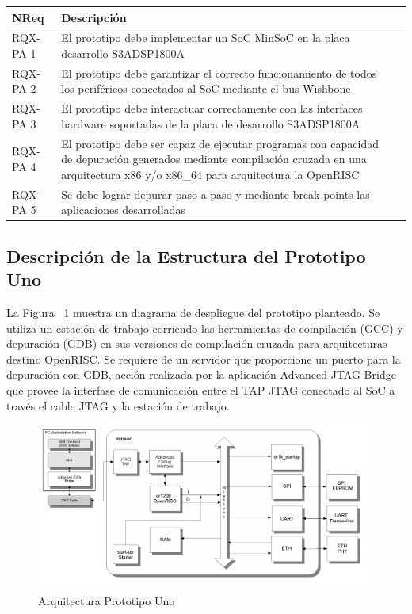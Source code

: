 		\begin{table}[h]
		\centering
		\begin{tabular}{ p{2.5cm} p{8cm} p{3cm} }
		\hline 
		\rowcolor[gray]{0.8} N\textordmasculine Req & Descripción\\
		\hline 
		RQX-PA 1 & El prototipo debe implementar un SoC MinSoC en la placa desarrollo S3ADSP1800A\\ 
		\hline 
		RQX-PA 2 & El prototipo debe garantizar el correcto funcionamiento de todos los periféricos conectados al SoC mediante el bus Wishbone\\ 
		\hline 
		RQX-PA 3 & El prototipo debe interactuar correctamente con las interfaces hardware soportadas de la placa de desarrollo S3ADSP1800A\\ 
		\hline
		RQX-PA 4 & El prototipo debe ser capaz de ejecutar programas con capacidad de depuración generados mediante compilación
		cruzada en una arquitectura x86 y/o x86\_64 para arquitectura la OpenRISC\\
		\hline
		RQX-PA 5 & Se debe lograr depurar paso a paso y mediante break points las aplicaciones desarrolladas\\
		\hline		
		\end{tabular}
		\end{table}
		
\newpage
		\subsection{Descripción de la Estructura del Prototipo Uno}
			

		La Figura ~\ref{fig:minsoc} muestra un diagrama de despliegue del prototipo planteado. Se utiliza un estación de trabajo corriendo las herramientas de compilación (GCC) y depuración (GDB) en sus versiones de compilación cruzada para arquitecturas destino OpenRISC. Se requiere de un
		servidor que proporcione un puerto para la depuración con GDB, acción realizada por la aplicación Advanced JTAG Bridge que provee la interfase de comunicación entre el TAP JTAG conectado al SoC a través el cable JTAG y la estación de trabajo.
		
		\begin{figure}[!h]
 		\begin{center}
  		\includegraphics[width=1\textwidth,keepaspectratio=true]{./images/minsoc}
  		\caption{Arquitectura Prototipo Uno}
  		\label{fig:minsoc}
 		\end{center}
		\end{figure}
		
